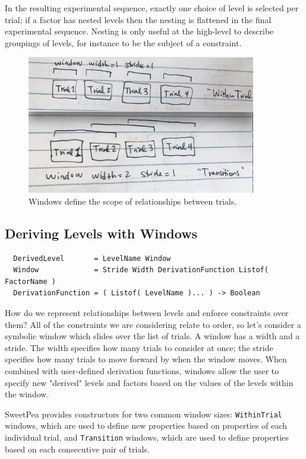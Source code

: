 In the resulting experimental sequence, exactly one choice of level is selected per trial; if a factor has nested levels then the nesting is flattened in the final experimental sequence. Nesting is only useful at the high-level to describe groupings of levels, for instance to be the subject of a constraint.

\begin{figure}[t]
    \centerline{\includegraphics[origin=c,width=10cm]{fig_windows}}
    \caption{Windows define the scope of relationships between trials.}%
    \label{fig:windows}%
\end{figure}


\subsection{Deriving Levels with Windows}

\begin{verbatim}
  DerivedLevel       = LevelName Window
  Window             = Stride Width DerivationFunction Listof( FactorName )
  DerivationFunction = ( Listof( LevelName )... ) -> Boolean
\end{verbatim}

How do we represent relationships between levels and enforce constraints over them? All of the constraints we are considering relate to order, so let's consider a symbolic window which slides over the list of trials. A window has a width and a stride. The width specifies how many trials to consider at once; the stride specifies how many trials to move forward by when the window moves. When combined with user-defined derivation functions, windows allow the user to specify new "derived" levels and factors based on the values of the levels within the window.

SweetPea provides constructors for two common window sizes: \texttt{WithinTrial} windows, which are used to define new properties based on properties of each individual trial, and \texttt{Transition} windows, which are used to define properties based on each consecutive pair of trials.

